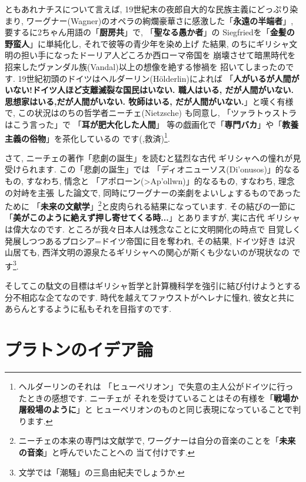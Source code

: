ともあれナチスについて言えば, 19世紀末の夜郎自大的な民族主義にどっぷり染まり,
 ワーグナー(Wagner)のオペラの絢爛豪華さに感激した「\textbf{永遠の半端者}」,
 要するに2ちゃん用語の「\textbf{厨房共}」で, 「\textbf{聖なる愚か者}」の
Siegfriedを「\textbf{金髪の野蛮人}」に単純化し, それで彼等の青少年を染め上げ
た結果, のちにギリシャ文明の担い手になったドーリア人どころか西ローマ帝国を
崩壊させて暗黒時代を招来したヴァンダル族(Vandal)以上の想像を絶する惨禍を
招いてしまったのです. 19世紀初頭のドイツはヘルダーリン(H\"olderlin)によれば
「\textbf{人がいるが人間がいない!ドイツ人ほど支離滅裂な国民はいない.
 職人はいる, だが人間がいない. 思想家はいる,だが人間がいない. 牧師はいる,
 だが人間がいない.}」と嘆く有様で,  この状況はのちの哲学者ニーチェ(Nietzsche)
も同意し, 「ツァラトゥストラはこう言った」で 「\textbf{耳が肥大化した人間}」
等の戯画化で「\textbf{専門バカ}」や「\textbf{教養主義の俗物}」を茶化しているの
です(\cite{ツァラトゥストラ},救済)\footnote{ヘルダーリンのそれは
「ヒューペリオン」で失意の主人公がドイツに行ったときの感想です. ニーチェが
それを受けていることはその有様を「\textbf{戦場か屠殺場のように}」と
ヒューペリオンのものと同じ表現になっていることで判ります.}.
\newline

さて, ニーチェの著作「悲劇の誕生」\cite{悲劇の誕生}を読むと猛烈な古代
ギリシャへの憧れが見受けられます. この「悲劇の誕生」では
「ディオニューソス(\textgreek{Di'onusos})」的なるもの, すなわち, 情念と
「アポローン(\textgreek{>Ap'ollwn})」的なるもの, すなわち, 理念の対峙を主張
した論文で, 同時にワーグナーの楽劇をよいしょするものであったために
「\textbf{未来の文献学}」\footnote{ニーチェの本来の専門は文献学で,
 ワーグナーは自分の音楽のことを「\textbf{未来の音楽}」と呼んでいたことへの
当て付けです.}と皮肉られる結果になっています. その結びの一節に
「\textbf{美がこのように絶えず押し寄せてくる時...}」とありますが, 実に古代
ギリシャは偉大なのです. ところが我々日本人は残念なことに文明開化の時点で
目覚しく発展しつつあるプロシア=ドイツ帝国に目を奪われ, その結果, ドイツ好き
は沢山居ても, 西洋文明の源泉たるギリシャへの関心が斯くも少ないのが現状なの
です\footnote{文学では「潮騒」の三島由紀夫でしょうか.}.
\newline

そしてこの駄文の目標はギリシャ哲学と計算機科学を強引に結び付けようとする
分不相応な企てなのです. 時代を越えてファウストがヘレナに憧れ, 彼女と共に
あらんとするように私もそれを目指すのです.

\section{プラトンのイデア論}


